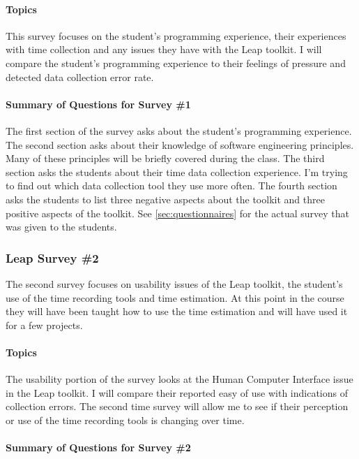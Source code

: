 \paragraph{Topics}
This survey focuses on the student's programming experience, their experiences
with time collection and any issues they have with the Leap toolkit. I will
compare the student's programming experience to their feelings of pressure and
detected data collection error rate.

\paragraph{Summary of Questions for Survey \#1}

The first section of the survey asks about the student's programming
experience. The second section asks about their knowledge of software
engineering principles.  Many of these principles will be briefly covered
during the class. The third section asks the students about their time data
collection experience. I'm trying to find out which data collection tool they
use more often.  The fourth section asks the students to list three negative
aspects about the toolkit and three positive aspects of the toolkit.  See
\ref{sec:questionnaires} for the actual survey that was given to the students.

\subsubsection{Leap Survey \#2}
\label{area2}

The second survey focuses on usability issues of the Leap toolkit, the
student's use of the time recording tools and time estimation. At this point in 
the course they will have been taught how to use the time estimation and will
have used it for a few projects.

\paragraph{Topics}
The usability portion of the survey looks at the Human Computer Interface issue 
in the Leap toolkit.  I will compare their reported easy of use with
indications of collection errors.  The second time survey will allow me to see
if their perception or use of the time recording tools is changing over time.

\paragraph{Summary of Questions for Survey \#2}

